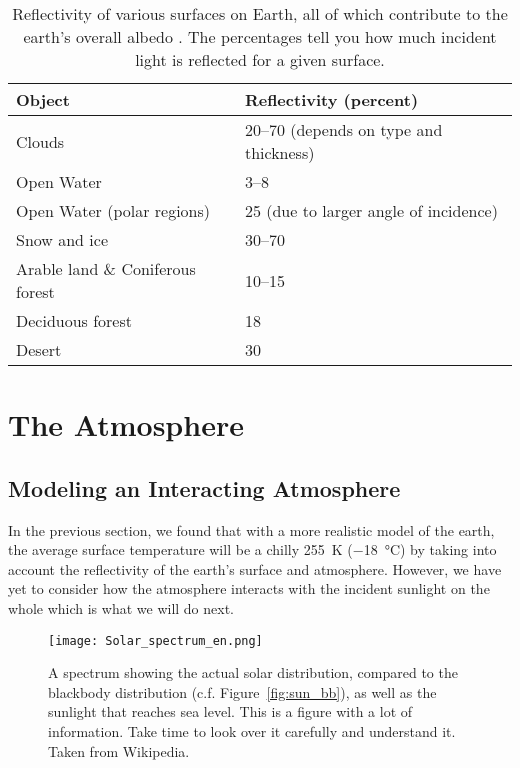     \begin{table}[ht]
    \centering
    \begin{tabular}{|p{5cm}|p{6cm}|}
        \hline
        \textbf{Object}     & \textbf{Reflectivity (percent)}\\
        \hline
        Clouds & 20--70 (depends on type and thickness) \\
        Open Water  & 3--8 \\
        Open Water (polar regions) & 25 (due to larger angle of incidence) \\
        Snow and ice   & 30--70 \\
        Arable land \& Coniferous forest & 10--15 \\
        Deciduous forest  & 18   \\
        Desert & 30  \\
        \hline
    \end{tabular}
    \caption{Reflectivity of various surfaces on Earth, all of which contribute to the earth's overall albedo \citep{thorndike1976energy}. The percentages tell you how much incident light is reflected for a given surface.}  
    \label{tab:albedo}     
    \end{table}


    
   \section{The Atmosphere} %
   \label{sec:the_atmosphere}
	
	\subsection{Modeling an Interacting Atmosphere}
    
    In the previous section, we found that with a more realistic model of the earth, the average surface temperature will be a chilly \SI{255}{\kelvin} (\SI{-18}{\celsius}) by taking into account the reflectivity of the earth's surface and atmosphere. However, we have yet to consider how the atmosphere interacts with the incident sunlight on the whole which is what we will do next.

    \begin{figure}[ht]
        \centering 
        \texttt{[image: Solar\_spectrum\_en.png]}
        \caption{A spectrum showing the actual solar distribution, compared to the blackbody distribution (c.f. Figure~\ref{fig:sun_bb}), as well as the sunlight that reaches sea level. This is a figure with a lot of information. Take time to look over it carefully and understand it. Taken from Wikipedia.}
        \label{fig:solar_spec}
    \end{figure}

